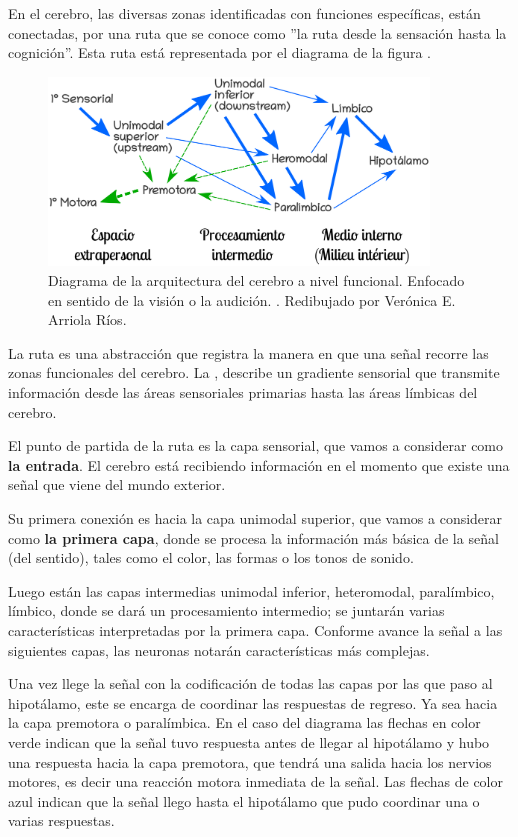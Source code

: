 En el cerebro, las diversas zonas identificadas con funciones específicas, están conectadas, por una ruta que se conoce como 
 ''la ruta desde la sensación hasta la cognición''. Esta ruta está representada por el diagrama de la figura . \parencite{sensAcogn}
 
 \begin{figure}[h]
  \centering
  \includegraphics[width=0.9\textwidth]{../Figuras/zonasFuncionales.png}
  \caption{Diagrama de la arquitectura del cerebro a nivel funcional. Enfocado en sentido de la visión o la audición. \parencite{Mesulam1998}. Redibujado por Verónica E. Arriola Ríos. }
  \label{fig:zonasFun}
 \end{figure}

La ruta es una abstracción que registra la manera en que una señal recorre las zonas funcionales del cerebro.
La , describe un gradiente sensorial que transmite información desde las áreas sensoriales primarias hasta las áreas límbicas del cerebro.

El punto de partida de la ruta es la capa sensorial, que vamos a considerar como \textbf{la entrada}. El cerebro está recibiendo información en el momento que existe una señal que viene del mundo exterior.

Su primera conexión es hacia la capa unimodal superior, que vamos a considerar como \textbf{la primera capa}, donde se procesa la información más básica de la señal (del sentido), tales como el color, las formas o los tonos de sonido.

Luego están las capas intermedias unimodal inferior, heteromodal, paralímbico, límbico, donde se dará un procesamiento intermedio; se juntarán varias características interpretadas por la primera capa. Conforme avance la señal a las siguientes capas, las neuronas notarán características más complejas. 

Una vez llege la señal con la codificación de todas las capas por las que paso al hipotálamo, este se encarga de coordinar las respuestas de regreso. Ya sea hacia la capa premotora o paralímbica. En el caso del diagrama las flechas en color verde indican que la señal tuvo respuesta antes de llegar al hipotálamo y hubo una respuesta hacia la capa premotora, que tendrá una salida hacia los nervios motores, es decir una reacción motora inmediata de la señal. Las flechas de color azul indican que la señal llego hasta el hipotálamo que pudo coordinar una o varias respuestas. 

